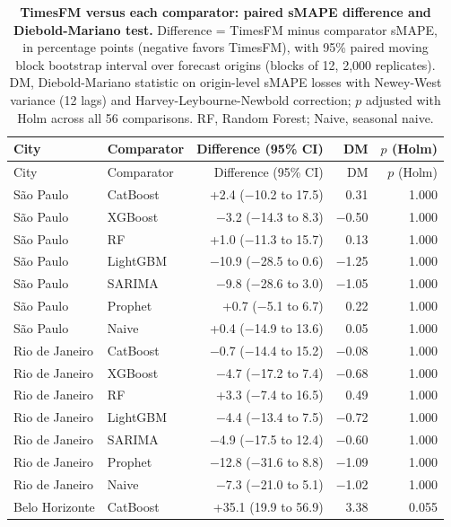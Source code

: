 
\begin{longtable}{llrrr}
\caption{\textbf{TimesFM versus each comparator: paired sMAPE difference and Diebold-Mariano test.} Difference = TimesFM minus comparator sMAPE, in percentage points (negative favors TimesFM), with 95\% paired moving block bootstrap interval over forecast origins (blocks of 12, 2,000 replicates). DM, Diebold-Mariano statistic on origin-level sMAPE losses with Newey-West variance (12 lags) and Harvey-Leybourne-Newbold correction; $p$ adjusted with Holm across all 56 comparisons. RF, Random Forest; Naive, seasonal naive.}\label{tabF}\\
\toprule
City & Comparator & Difference (95\% CI) & DM & $p$ (Holm) \\
\midrule
\endfirsthead
\toprule
City & Comparator & Difference (95\% CI) & DM & $p$ (Holm) \\
\midrule
\endhead
S\~ao Paulo & CatBoost & +2.4 ($-$10.2 to 17.5) & 0.31 & 1.000 \\
S\~ao Paulo & XGBoost & $-$3.2 ($-$14.3 to 8.3) & $-$0.50 & 1.000 \\
S\~ao Paulo & RF & +1.0 ($-$11.3 to 15.7) & 0.13 & 1.000 \\
S\~ao Paulo & LightGBM & $-$10.9 ($-$28.5 to 0.6) & $-$1.25 & 1.000 \\
S\~ao Paulo & SARIMA & $-$9.8 ($-$28.6 to 3.0) & $-$1.05 & 1.000 \\
S\~ao Paulo & Prophet & +0.7 ($-$5.1 to 6.7) & 0.22 & 1.000 \\
S\~ao Paulo & Naive & +0.4 ($-$14.9 to 13.6) & 0.05 & 1.000 \\
Rio de Janeiro & CatBoost & $-$0.7 ($-$14.4 to 15.2) & $-$0.08 & 1.000 \\
Rio de Janeiro & XGBoost & $-$4.7 ($-$17.2 to 7.4) & $-$0.68 & 1.000 \\
Rio de Janeiro & RF & +3.3 ($-$7.4 to 16.5) & 0.49 & 1.000 \\
Rio de Janeiro & LightGBM & $-$4.4 ($-$13.4 to 7.5) & $-$0.72 & 1.000 \\
Rio de Janeiro & SARIMA & $-$4.9 ($-$17.5 to 12.4) & $-$0.60 & 1.000 \\
Rio de Janeiro & Prophet & $-$12.8 ($-$31.6 to 8.8) & $-$1.09 & 1.000 \\
Rio de Janeiro & Naive & $-$7.3 ($-$21.0 to 5.1) & $-$1.02 & 1.000 \\
Belo Horizonte & CatBoost & +35.1 (19.9 to 56.9) & 3.38 & 0.055 \\

\end{longtable}
